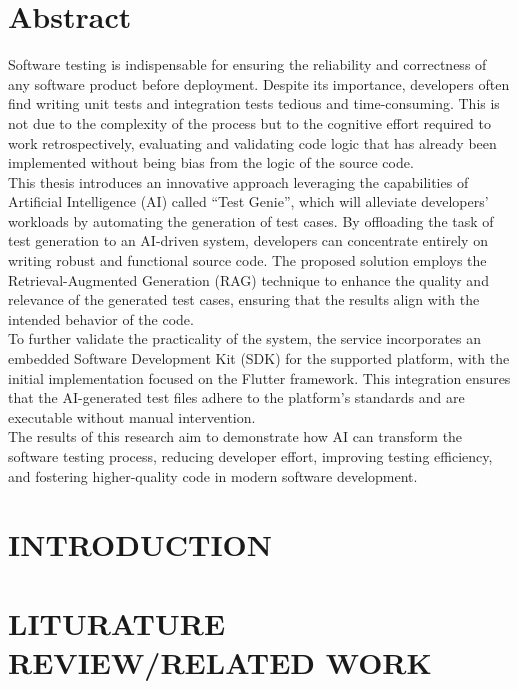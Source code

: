 \documentclass[12pt, oneside]{report}
\begin{document}
\chapter*{Abstract}
Software testing is indispensable for ensuring the reliability and correctness of any software product before deployment. Despite its importance, developers often find writing unit tests and integration tests tedious and time-consuming. This is not due to the complexity of the process but to the cognitive effort required to work retrospectively, evaluating and validating code logic that has already been implemented without being bias from the logic of the source code. \\
This thesis introduces an innovative approach leveraging the capabilities of Artificial Intelligence (AI) called “Test Genie”, which will alleviate developers' workloads by automating the generation of test cases. By offloading the task of test generation to an AI-driven system, developers can concentrate entirely on writing robust and functional source code. The proposed solution employs the Retrieval-Augmented Generation (RAG) technique to enhance the quality and relevance of the generated test cases, ensuring that the results align with the intended behavior of the code. \\
To further validate the practicality of the system, the service incorporates an embedded Software Development Kit (SDK) for the supported platform, with the initial implementation focused on the Flutter framework. This integration ensures that the AI-generated test files adhere to the platform's standards and are executable without manual intervention. \\
The results of this research aim to demonstrate how AI can transform the software testing process, reducing developer effort, improving testing efficiency, and fostering higher-quality code in modern software development.


\chapter{INTRODUCTION}
\setcounter{page}{1}


\chapter{LITURATURE REVIEW/RELATED WORK}

\end{document}
